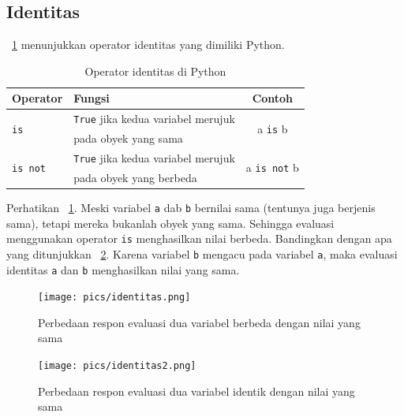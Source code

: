 \subsection{Identitas}
\tablename~\ref{tab:identitas} menunjukkan operator identitas yang dimiliki Python.

\begin{table}[h]
\caption{Operator identitas di Python}
\label{tab:identitas}
  \begin{center}
    \begin{tabular}{@{}llc@{}}\toprule
    Operator & Fungsi  & Contoh\\ \midrule
    \multirow{2}{*}{\texttt{is}} & \texttt{True} jika kedua variabel merujuk  & \multirow{2}{*}{a \texttt{is} b} \\
    & pada obyek yang sama & \\
    \multirow{2}{*}{\texttt{is not}} & \texttt{True} jika kedua variabel merujuk & \multirow{2}{*}{a \texttt{is not} b} \\
    & pada obyek yang berbeda &\\
       \bottomrule
    \end{tabular}
  \end{center}
\end{table}

Perhatikan \figurename~\ref{fig:identitas}. Meski variabel \texttt{a} dab \texttt{b} bernilai sama (tentunya juga berjenis sama), tetapi mereka bukanlah obyek yang sama. Sehingga evaluasi menggunakan operator \texttt{is} menghasilkan nilai berbeda. Bandingkan dengan apa yang ditunjukkan \figurename~\ref{fig:identitas2}. Karena variabel \texttt{b} mengacu pada variabel \texttt{a}, maka evaluasi identitas \texttt{a} dan \texttt{b} menghasilkan nilai yang sama.

\begin{figure}
  \begin{center}
    \texttt{[image: pics/identitas.png]}
    \caption{Perbedaan respon evaluasi dua variabel berbeda dengan nilai yang sama}
    \label{fig:identitas}
  \end{center}
\end{figure}

\begin{figure}
  \begin{center}
    \texttt{[image: pics/identitas2.png]}
    \caption{Perbedaan respon evaluasi dua variabel identik dengan nilai yang sama}
    \label{fig:identitas2}
  \end{center}
\end{figure}

